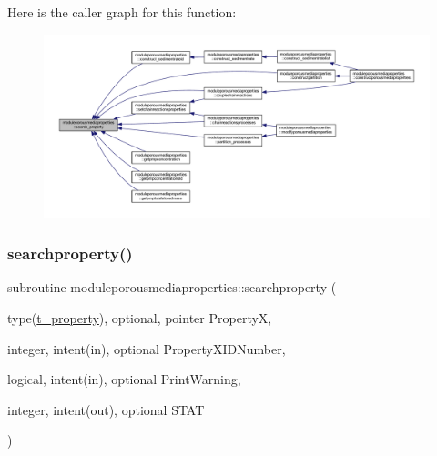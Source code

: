 Here is the caller graph for this function\+:\nopagebreak
\begin{figure}[H]
\begin{center}
\leavevmode
\includegraphics[width=350pt]{namespacemoduleporousmediaproperties_af477cac3aa38958d32a9af0ae317241f_icgraph}
\end{center}
\end{figure}
\mbox{\label{namespacemoduleporousmediaproperties_af651cef8320f1769d6f02a15144aae88}} 
\subsubsection{\texorpdfstring{searchproperty()}{searchproperty()}}
{\footnotesize\ttfamily subroutine moduleporousmediaproperties\+::searchproperty (\begin{DoxyParamCaption}\item[{type(\mbox{\hyperlink{structmoduleporousmediaproperties_1_1t__property}{t\+\_\+property}}), optional, pointer}]{PropertyX,  }\item[{integer, intent(in), optional}]{Property\+X\+I\+D\+Number,  }\item[{logical, intent(in), optional}]{Print\+Warning,  }\item[{integer, intent(out), optional}]{S\+T\+AT }\end{DoxyParamCaption})\hspace{0.3cm}{\ttfamily [private]}}

